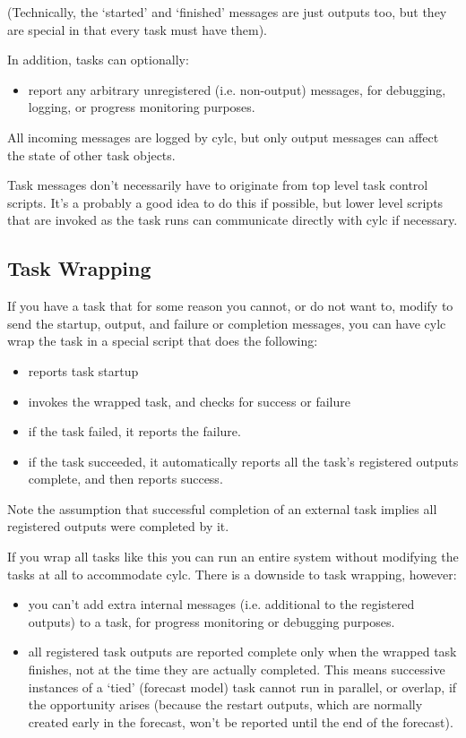 \documentclass[11pt,a4paper]{article}
\begin{document}
(Technically, the `started' and `finished' messages are just
outputs too, but they are special in that every task
must have them).

In addition, tasks can optionally:

\begin{itemize}
\item report any arbitrary unregistered (i.e. non-output)
messages, for debugging, logging, or progress monitoring purposes.
\end{itemize}

All incoming messages are logged by cylc, but only output messages can
affect the state of other task objects.

Task messages don't necessarily have to originate from top level task
control scripts. It's a probably a good idea to do this if possible, but
lower level scripts that are invoked as the task runs can communicate
directly with cylc if necessary.

\subsection{Task Wrapping}
\label{TaskWrapping}

If you have a task that for some reason you cannot, or do not want to,
modify to send the startup, output, and failure or completion messages, 
you can have cylc wrap the task in a special script that does the following:

\begin{itemize}
    \item reports task startup
    \item invokes the wrapped task, and checks for success or failure
    \item if the task failed, it reports the failure. 
    \item if the task succeeded, it automatically reports all the task's
        registered outputs complete, and then reports success.
\end{itemize}

Note the assumption that successful completion of an external task
implies all registered outputs were completed by it.

If you wrap all tasks like this you can run an entire system without
modifying the tasks at all to accommodate cylc. There is a downside to
task wrapping, however:

\begin{itemize}
    \item you can't add extra internal messages (i.e. additional to the
        registered outputs) to a task, for progress monitoring or
        debugging purposes.
    \item all registered task outputs are reported complete only
        when the wrapped task finishes, not at the time they are actually
        completed. This means successive instances of a `tied' (forecast
        model) task cannot run in parallel, or overlap, if the
        opportunity arises (because the restart outputs, which are
        normally created early in the forecast, won't be reported until
        the end of the forecast).
\end{itemize} 
\end{document}
